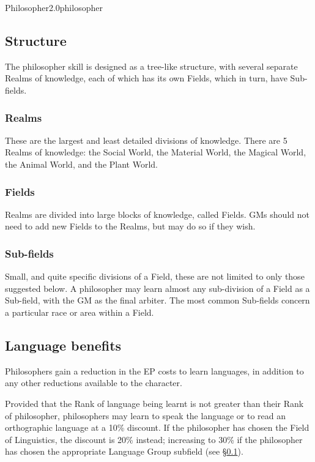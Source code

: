 \begin{skill}{Philosopher}{2.0}{philosopher}
\subsection{Structure}
\label{philosopher:structure}

The philosopher skill is designed as a tree-like structure, with
several separate Realms of knowledge, each of which has its own
Fields, which in turn, have Sub-fields.

\subsubsection{Realms}

These are the largest and least detailed divisions of knowledge.
There are 5 Realms of knowledge: the Social World, the Material World,
the Magical World, the Animal World, and the Plant World.

\subsubsection{Fields}

Realms are divided into large blocks of knowledge, called Fields.  GMs
should not need to add new Fields to the Realms, but may do so if they
wish.

\subsubsection{Sub-fields}

Small, and quite specific divisions of a Field, these are not limited
to only those suggested below.  A philosopher may learn almost any
sub-division of a Field as a Sub-field, with the GM as the final
arbiter. The most common Sub-fields concern a particular race or area
within a Field.

\subsection{Language benefits}

Philosophers gain a reduction in the EP costs to learn languages, in
addition to any other reductions available to the character.

Provided that the Rank of language being learnt is not greater than
their Rank of philosopher, philosophers may learn to speak the
language or to read an orthographic language at a 10\% discount.  If
the philosopher has chosen the Field of Linguistics, the discount is
20\% instead; increasing to 30\% if the philosopher has chosen the
appropriate Language Group subfield (see
\S\ref{philosopher:structure}).


\end{skill}
